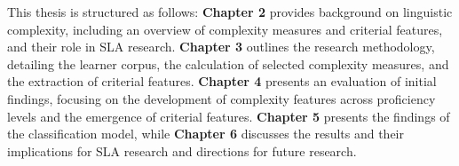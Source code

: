This thesis is structured as follows: \textbf{Chapter 2} provides background on linguistic complexity, including an
overview of complexity measures and criterial features, and their role in SLA research.
\textbf{Chapter 3} outlines the research methodology, detailing the learner corpus, the calculation of selected
complexity measures, and the extraction of criterial features.
 \textbf{Chapter 4} presents an evaluation of initial findings, focusing on the development of complexity features
across
proficiency levels and the emergence of criterial features.
\textbf{Chapter 5 } presents the findings of the classification model, while
\textbf{Chapter 6}
discusses the results and their implications for SLA research and directions for
future research.

